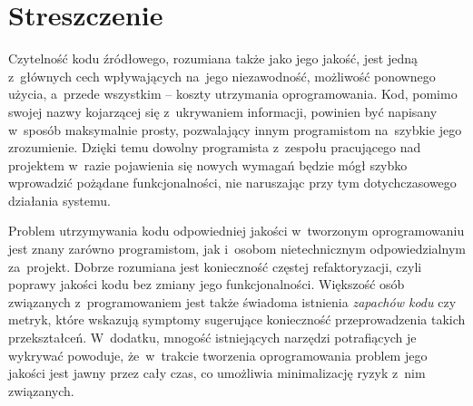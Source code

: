 \documentclass[twoside]{praca}
\author{mgr inż. Wojciech Frącz}
\date{2019}
\begin{document}

\titlepages


\setcounter{tocdepth}{1}
\tableofcontents

\clearpage
\thispagestyle{empty}
\hphantom{2mm}
\clearpage

\chapter*{Streszczenie}

Czytelność kodu źródłowego, rozumiana także jako jego jakość, jest jedną z~głównych cech wpływających na~jego niezawodność, możliwość ponownego użycia, a~przede wszystkim -- koszty utrzymania oprogramowania. Kod, pomimo swojej nazwy kojarzącej się z~ukrywaniem informacji, powinien być napisany w~sposób maksymalnie prosty, pozwalający innym programistom na~szybkie jego zrozumienie. Dzięki temu dowolny programista z~zespołu pracującego nad projektem w~razie pojawienia się nowych wymagań będzie mógł szybko wprowadzić pożądane funkcjonalności, nie naruszając przy tym dotychczasowego działania systemu.

Problem utrzymywania kodu odpowiedniej jakości w~tworzonym oprogramowaniu jest znany zarówno programistom, jak i~osobom nietechnicznym odpowiedzialnym za~projekt. Dobrze rozumiana jest konieczność częstej refaktoryzacji, czyli poprawy jakości kodu bez zmiany jego funkcjonalności. Większość osób związanych z~programowaniem jest także świadoma istnienia \textit{zapachów kodu} czy metryk, które wskazują symptomy sugerujące konieczność przeprowadzenia takich przekształceń. W~dodatku, mnogość istniejących narzędzi potrafiących je wykrywać powoduje, że~w~trakcie tworzenia oprogramowania problem jego jakości jest jawny przez cały czas, co umożliwia minimalizację ryzyk z~nim związanych.

\end{document}
